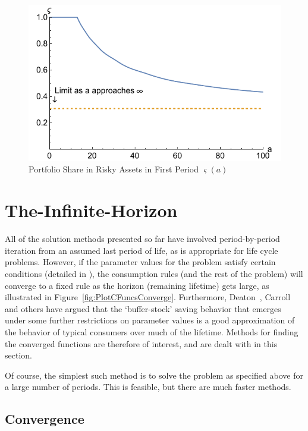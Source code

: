 \documentclass[titlepage, headings=optiontotocandhead]{\econtex}
\begin{document}
\hypertarget{PlotRiskySharetOfat}{}
\begin{figure}
  \includegraphics{./Figures/PlotRiskySharetOfat}
  \caption{Portfolio Share in Risky Assets in First Period $\varsigma({a})$}
  \label{fig:PlotRiskySharetOfat}
\end{figure}

\hypertarget{The-Infinite-Horizon}{}
\section{The-Infinite-Horizon}

All of the solution methods presented so far have involved
period-by-period iteration from an assumed last period of life, as is
appropriate for life cycle problems.  However, if the parameter values
for the problem satisfy certain conditions (detailed in
\cite{BufferStockTheory}), the consumption rules (and the rest of
the problem) will converge to a fixed rule as the horizon (remaining
lifetime) gets large, as illustrated in
Figure~\ref{fig:PlotCFuncsConverge}.  Furthermore,
Deaton~\citeyearpar{deatonLiqConstr},
Carroll~\citeyearpar{carroll:brookings,carrollBSLCPIH} and others
have argued that the `buffer-stock' saving behavior that emerges under
some further restrictions on parameter values is a good approximation
of the behavior of typical consumers over much of the lifetime.
Methods for finding the converged functions are therefore of interest,
and are dealt with in this section.

Of course, the simplest such method is to solve the problem as
specified above for a large number of periods.  This is feasible, but
there are much faster methods.

\subsection{Convergence}
\end{document}
